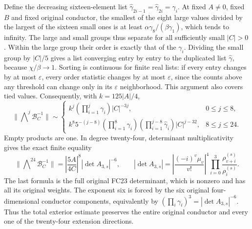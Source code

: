 \documentclass[11pt]{article}
\begin{document}
Define the decreasing sixteen-element list
$\widehat\gamma_{2i-1}=\widehat\gamma_{2i}=\gamma_i$.
At fixed $A\ne0$, fixed $B$ and fixed original conductor, the smallest
of the eight large values divided by the largest of the sixteen small
ones is at least $\alpha\gamma_8/(\beta\gamma_1)$, which tends to
infinity. The large and small groups thus separate for all sufficiently
small $|C|>0$. Within the large group their order is exactly that of
the $\gamma_i$. Dividing the small group by $|C|/5$ gives a list
converging entry by entry to the duplicated list $\widehat\gamma$,
because $\chi/\beta\to1$. Sorting is continuous for finite real lists:
if every entry changes by at most $\varepsilon$, every order statistic
changes by at most $\varepsilon$, since the counts above any threshold
can change only in its $\varepsilon$ neighborhood. This argument also
covers tied values. Consequently, with $k=125|A|/4$,
\[
 \|\mathop{\bigwedge}\nolimits^j\mathcal B_C^{-1}\|
 \sim\begin{cases}
 k^j(\prod_{i=1}^{j}\gamma_i)|C|^{-3j},&0\le j\le8,\\
 k^8 5^{-(j-8)}(\prod_{i=1}^{8}\gamma_i)
      (\prod_{i=1}^{j-8}\widehat\gamma_i)|C|^{j-32},&8\le j\le24.
 \end{cases}                                                \tag{ETR27}
\]
Empty products are one. In degree twenty-four, determinant
multiplicativity gives the exact finite equality
\[
 \|\mathop{\bigwedge}\nolimits^{24}\mathcal B_C^{-1}\|
   =\left|\frac{5A}{4C}\right|^8 |\det A_{3,s}|^{-6},\qquad
 |\det A_{3,s}|=
 \left|\frac{(-i)^v\mu_v}{v!}\right|^4
       \prod_{i=0}^{3}\frac{\rho_{v+i}^{(s)}}{\rho_i^{(s)}}.
                                                               \tag{ETR28}
\]
The last formula is the full original FC23 determinant, which is
nonzero and has all its original weights. The exponent six is forced
by the six original four-dimensional conductor components, equivalently
by $(\prod_i\gamma_i)^3=|\det A_{3,s}|^{-6}$. Thus the total exterior
estimate preserves the entire original conductor and every one of the
twenty-four extension directions.
\end{document}
